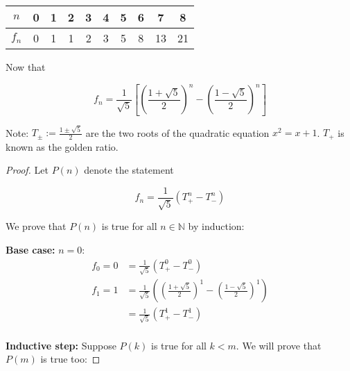 \documentclass[11pt, draft]{article}
\begin{document}
\begin{enumerate}
        \begin{center}
            \begin{tabular}{|c|c|c|c|c|c|c|c|c|c|}
                \hline
                $n$   & 0 & 1 & 2 & 3 & 4 & 5 & 6 & 7  & 8  \\
                \hline
                $f_n$ & 0 & 1 & 1 & 2 & 3 & 5 & 8 & 13 & 21 \\
                \hline
            \end{tabular}
        \end{center}       
        Now that

          \[
              f_n = \frac{1}{\sqrt{5}} \left[ \left( \frac{1 + \sqrt{5}}{2} \right)^n - \left( \frac{1 - \sqrt{5}}{2} \right)^n \right]
          \]

          Note: $T_{\pm} := \frac{1 \pm \sqrt{5}}{2}$ are the two roots of the quadratic
          equation $x^2 = x + 1$. $T_+$ is known as the golden ratio.

          \begin{proof}

              Let $P(n)$ denote the statement

              \[
                  f_n = \frac{1}{\sqrt{5}} \left( T_+^n - T_-^n \right)
              \]

              We prove that $P(n)$ is true for all $n \in \mathbb{N}$ by induction:

              \textbf{Base case:} $n = 0$:
              \[
                  \begin{aligned}
                      f_0 = 0 & = \frac{1}{\sqrt{5}} \left( T_+^0 - T_-^0 \right)                                                                     \\
                      f_1 = 1 & = \frac{1}{\sqrt{5}} \left( \left( \frac{1 + \sqrt{5}}{2} \right)^1 - \left( \frac{1 - \sqrt{5}}{2} \right)^1 \right) \\
                              & = \frac{1}{\sqrt{5}} \left( T_+^1 - T_-^1 \right)
                  \end{aligned}
              \]
              \\\textbf{Inductive step:} Suppose $P(k)$ is true for all $k < m$. We will prove that $P(m)$ is true too:


\end{proof}
\end{enumerate}
\end{document}
